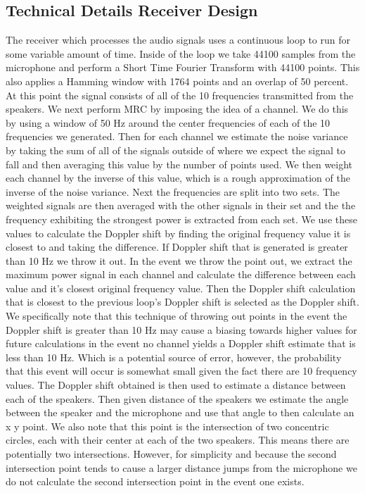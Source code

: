 \documentclass{acm_proc_article-sp}
\begin{document}
\subsection{Technical Details Receiver Design} \label{technical_details Receiver Design}
The receiver which processes the audio signals uses a continuous loop to run for some variable amount of time. Inside of the loop we take 44100 samples from the microphone and perform a Short Time Fourier Transform with 44100 points. This also applies a Hamming window with 1764 points and an overlap of 50 percent. At this point the signal consists of all of the 10 frequencies transmitted from the speakers. We next perform MRC by imposing the idea of a channel. We do this by using a window of 50 Hz around the center frequencies of each of the 10 frequencies we generated. Then for each channel we estimate the noise variance by taking the sum of all of the signals outside of where we expect the signal to fall and then averaging this value by the number of points used. We then weight each channel by the inverse of this value, which is a rough approximation of the inverse of the noise variance. Next the frequencies are split into two sets.  The weighted signals are then averaged with the other signals in their set and the the frequency exhibiting the strongest power is extracted from each set. We use these values to calculate the Doppler shift by finding the original frequency value it is closest to and taking the difference. If Doppler shift that is generated is greater than 10 Hz we throw it out. In the event we throw the point out, we extract the maximum power signal in each channel and calculate the difference between each value and it's closest original frequency value. Then the Doppler shift calculation that is closest to the previous loop's Doppler shift is selected as the Doppler shift. We specifically note that this technique of throwing out points in the event the Doppler shift is greater than 10 Hz may cause a biasing towards higher values for future calculations in the event no channel yields a Doppler shift estimate that is less than 10 Hz. Which is a potential source of error, however, the probability that this event will occur is somewhat small given the fact there are 10 frequency values. The Doppler shift obtained is then used to estimate a distance between each of the speakers. Then given distance of the speakers we estimate the angle between the speaker and the microphone and use that angle to then calculate an x y point. We also note that this point is the intersection of two concentric circles, each with their center at each of the two speakers. This means there are potentially two intersections. However, for simplicity and because the second intersection point tends to cause a larger distance jumps from the microphone we do not calculate the second intersection point in the event one exists. 
\end{document}
